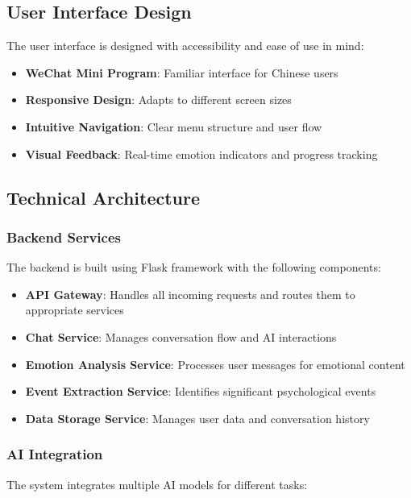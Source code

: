 \subsection{User Interface Design}

The user interface is designed with accessibility and ease of use in mind:

\begin{itemize}
    \item \textbf{WeChat Mini Program}: Familiar interface for Chinese users
    \item \textbf{Responsive Design}: Adapts to different screen sizes
    \item \textbf{Intuitive Navigation}: Clear menu structure and user flow
    \item \textbf{Visual Feedback}: Real-time emotion indicators and progress tracking
\end{itemize}

\subsection{Technical Architecture}

\subsubsection{Backend Services}

The backend is built using Flask framework with the following components:

\begin{itemize}
    \item \textbf{API Gateway}: Handles all incoming requests and routes them to appropriate services
    \item \textbf{Chat Service}: Manages conversation flow and AI interactions
    \item \textbf{Emotion Analysis Service}: Processes user messages for emotional content
    \item \textbf{Event Extraction Service}: Identifies significant psychological events
    \item \textbf{Data Storage Service}: Manages user data and conversation history
\end{itemize}

\subsubsection{AI Integration}

The system integrates multiple AI models for different tasks:

